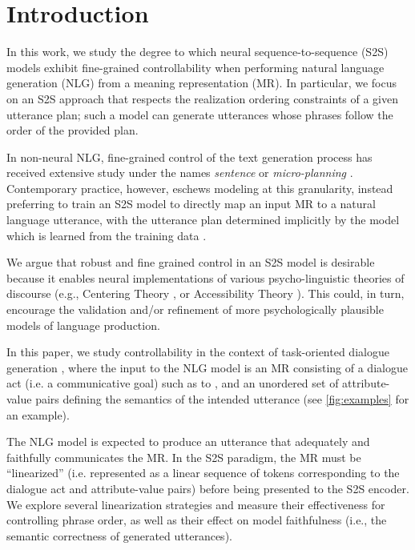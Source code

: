\section{Introduction}

In this work, we study the degree to which neural sequence-to-sequence (S2S)
models exhibit fine-grained controllability when performing natural language
generation (NLG) from a meaning representation (MR).  In particular, we focus
on an  S2S approach that respects the realization ordering constraints of a
given utterance plan; such a model can generate utterances whose phrases
follow the order of the provided plan.

In non-neural NLG, fine-grained control of the text generation process has
received extensive study under the names \textit{sentence} or
\textit{micro-planning} \cite{reiter2000,walker2001,stone2003}.  Contemporary
practice, however, eschews modeling at this granularity, instead preferring to
train an S2S model to directly map an input MR to a natural language
utterance, with the utterance plan determined implicitly by the model
which is learned from the training data \cite{dusek2020}.

We argue that robust and fine grained control in an S2S model is desirable
because it enables neural implementations of various psycho-linguistic
theories of discourse (e.g., Centering Theory \cite{grosz1995}, or
Accessibility Theory \cite{ariel2001}).  This could, in turn, encourage the
validation and/or refinement of more psychologically plausible models of
language production.
 


In this paper, we study controllability in the context of task-oriented
dialogue generation \cite{mairesse2010,wen2015}, where the input to the NLG
model is an MR consisting of a dialogue act (i.e. a communicative goal) such as
to , and an unordered set of attribute-value pairs
defining the semantics of the intended utterance (see \autoref{fig:examples}
for an example). 


The NLG model is expected to produce an utterance that adequately and
faithfully communicates the MR.  In the S2S paradigm, the MR must be
``linearized'' (i.e.  represented as a linear sequence of tokens corresponding
to the dialogue act and attribute-value pairs) before being presented to the S2S
 encoder.  We explore several linearization strategies and measure
their effectiveness for controlling phrase order, as well as their effect on
 model faithfulness (i.e., the semantic correctness of generated utterances).

